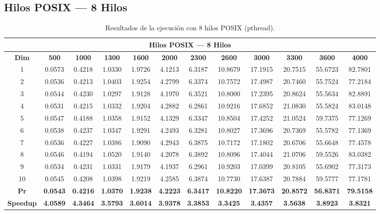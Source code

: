 \documentclass{article}
\begin{document}

\subsection{Hilos POSIX --- 8 Hilos}

\begin{table}[H]
\centering
\tiny
\begin{tabular}{|c|c|c|c|c|c|c|c|c|c|c|c|}
\hline
\multicolumn{12}{|c|}{\textbf{Hilos POSIX --- 8 Hilos}} \\
\hline
\textbf{Dim} & \textbf{500} & \textbf{1000} & \textbf{1300} & \textbf{1600} & \textbf{2000} & \textbf{2300} & \textbf{2600} & \textbf{3000} & \textbf{3300} & \textbf{3600} & \textbf{4000} \\
\hline
1  & 0.0573 & 0.4218 & 1.0330 & 1.9726 & 4.1213 & 6.3187 & 10.8679 & 17.1915 & 20.7515 & 55.6723 & 82.7801 \\
2  & 0.0536 & 0.4213 & 1.0403 & 1.9254 & 4.2799 & 6.3374 & 10.7572 & 17.4987 & 20.7460 & 55.7524 & 77.2184 \\
3  & 0.0544 & 0.4230 & 1.0297 & 1.9128 & 4.1970 & 6.3521 & 10.8000 & 17.2395 & 20.8624 & 55.5634 & 82.8891 \\
4  & 0.0531 & 0.4215 & 1.0332 & 1.9204 & 4.2882 & 6.2861 & 10.9216 & 17.6852 & 21.0830 & 55.5824 & 83.0148 \\
5  & 0.0547 & 0.4188 & 1.0358 & 1.9152 & 4.1329 & 6.3347 & 10.8504 & 17.4252 & 21.0524 & 59.7375 & 77.1269 \\
6  & 0.0538 & 0.4237 & 1.0347 & 1.9291 & 4.2493 & 6.3281 & 10.8027 & 17.3696 & 20.7369 & 55.5782 & 77.1369 \\
7  & 0.0536 & 0.4227 & 1.0386 & 1.9090 & 4.2943 & 6.3875 & 10.7172 & 17.1802 & 20.6706 & 55.6648 & 77.4578 \\
8  & 0.0546 & 0.4194 & 1.0520 & 1.9140 & 4.2078 & 6.3892 & 10.8096 & 17.4044 & 21.0706 & 59.5526 & 83.0382 \\
9  & 0.0534 & 0.4231 & 1.0331 & 1.9179 & 4.1937 & 6.2961 & 10.9203 & 17.0399 & 20.8105 & 55.6902 & 77.3173 \\
10 & 0.0545 & 0.4208 & 1.0398 & 1.9219 & 4.2585 & 6.3874 & 10.7730 & 17.6387 & 20.7884 & 59.5777 & 77.1781 \\
\hline
\textbf{Pr} & \textbf{0.0543} & \textbf{0.4216} & \textbf{1.0370} & \textbf{1.9238} & \textbf{4.2223} & \textbf{6.3417} & \textbf{10.8220} & \textbf{17.3673} & \textbf{20.8572} & \textbf{56.8371} & \textbf{79.5158} \\
\hline
\textbf{Speedup} & \textbf{4.0589} & \textbf{4.3464} & \textbf{3.5793} & \textbf{3.6014} & \textbf{3.9378} & \textbf{3.3853} & \textbf{3.3425} & \textbf{3.4357} & \textbf{3.5638} & \textbf{3.8923} & \textbf{3.8321} \\
\hline
\end{tabular}
\caption{Resultados de la ejecución con 8 hilos POSIX (pthread).}
\label{tab:t8}
\end{table}
\end{document}

